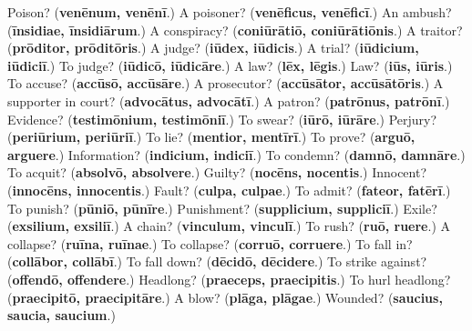\begin{tcolorbox}[breakable,colback=teal!4,colframe=teal!35!black,title={Before you move on}]
Poison? (\textbf{venēnum, venēnī}.) A poisoner? (\textbf{venēficus, venēficī}.) An ambush? (\textbf{īnsidiae, īnsidiārum}.) A conspiracy? (\textbf{coniūrātiō, coniūrātiōnis}.) A traitor? (\textbf{prōditor, prōditōris}.) A judge? (\textbf{iūdex, iūdicis}.) A trial? (\textbf{iūdicium, iūdiciī}.) To judge? (\textbf{iūdicō, iūdicāre}.) A law? (\textbf{lēx, lēgis}.) Law? (\textbf{iūs, iūris}.) To accuse? (\textbf{accūsō, accūsāre}.) A prosecutor? (\textbf{accūsātor, accūsātōris}.) A supporter in court? (\textbf{advocātus, advocātī}.) A patron? (\textbf{patrōnus, patrōnī}.) Evidence? (\textbf{testimōnium, testimōniī}.) To swear? (\textbf{iūrō, iūrāre}.) Perjury? (\textbf{periūrium, periūriī}.) To lie? (\textbf{mentior, mentīrī}.) To prove? (\textbf{arguō, arguere}.) Information? (\textbf{indicium, indiciī}.) To condemn? (\textbf{damnō, damnāre}.) To acquit? (\textbf{absolvō, absolvere}.) Guilty? (\textbf{nocēns, nocentis}.) Innocent? (\textbf{innocēns, innocentis}.) Fault? (\textbf{culpa, culpae}.) To admit? (\textbf{fateor, fatērī}.) To punish? (\textbf{pūniō, pūnīre}.) Punishment? (\textbf{supplicium, suppliciī}.) Exile? (\textbf{exsilium, exsiliī}.) A chain? (\textbf{vinculum, vinculī}.) To rush? (\textbf{ruō, ruere}.) A collapse? (\textbf{ruīna, ruīnae}.) To collapse? (\textbf{corruō, corruere}.) To fall in? (\textbf{collābor, collābī}.) To fall down? (\textbf{dēcidō, dēcidere}.) To strike against? (\textbf{offendō, offendere}.) Headlong? (\textbf{praeceps, praecipitis}.) To hurl headlong? (\textbf{praecipitō, praecipitāre}.) A blow? (\textbf{plāga, plāgae}.) Wounded? (\textbf{saucius, saucia, saucium}.)
\end{tcolorbox}
